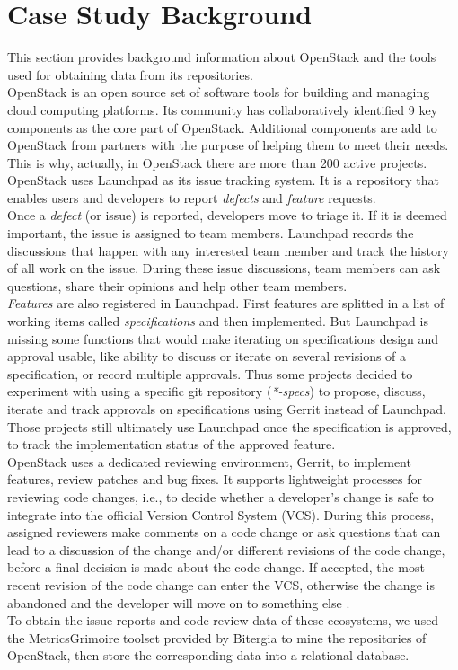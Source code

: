 \documentclass[10pt, conference]{IEEEtran}
\begin{document}
\section{Case Study Background}

This section provides background information about OpenStack and the tools used for 
obtaining data from its repositories.
\\
OpenStack is an open source set of software tools for building and
managing cloud computing platforms. Its community has
collaboratively identified 9 key components as the core part of OpenStack. 
Additional components are add to OpenStack from partners with the purpose 
of helping them to meet their needs. This is why, actually, in
OpenStack there are more than 200 active projects.
\\
OpenStack uses Launchpad as its issue tracking system. It is a repository
that enables users and developers to report \emph{defects} and \emph{feature} requests.
\\
Once a \emph{defect} (or issue) is reported, developers move to triage it. If it is deemed important, 
the issue is assigned to team members. Launchpad records the discussions that happen 
with any interested team member and track the history of all work on the issue. 
During these issue discussions, team members can ask questions, share their opinions 
and help other team members.
\\
\emph{Features} are also registered in Launchpad. 
First features are splitted in a list of working items called \emph{specifications} and then 
implemented.
But Launchpad is missing some functions that would make iterating on specifications design and approval usable, 
like ability to discuss or iterate on several revisions of a specification, or record multiple approvals. 
Thus some projects decided to experiment with using a specific git repository (\emph{*-specs}) to propose, discuss, 
iterate and track approvals on specifications using Gerrit instead of Launchpad. 
Those projects still ultimately use Launchpad once the specification is approved, 
to track the implementation status of the approved feature. 
\\
OpenStack uses a dedicated reviewing environment, Gerrit, to implement features, review patches
and bug fixes. It supports lightweight processes for reviewing code changes,
i.e., to decide whether a developer’s change is safe to integrate into the official
Version Control System (VCS). During this process, assigned reviewers make
comments on a code change or ask questions that can lead to a discussion of
the change and/or different revisions of the code change, before a final decision
is made about the code change. If accepted, the most recent revision of the
code change can enter the VCS, otherwise the change is abandoned and the
developer will move on to something else \cite{bib017}.
\\
To obtain the issue reports and code review data of these ecosystems, we
used the MetricsGrimoire toolset \cite{bib018} provided by Bitergia to mine the repositories of OpenStack, 
then store the corresponding data into a relational database.
\end{document}
